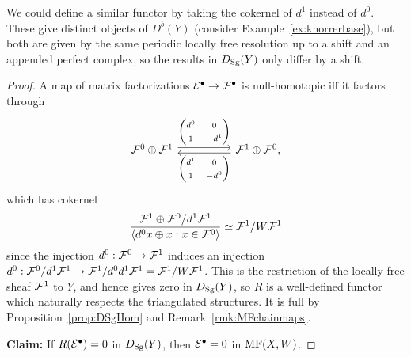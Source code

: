 \begin{remark}{}{}
    We could define a similar functor by taking the cokernel of $d^1$ instead of
    $d^0$. These give distinct objects of $D^b(Y)$ (consider
    Example~\ref{ex:knorrerbase}), but both are given by the same periodic
    locally free resolution up to a shift and an appended perfect complex, so
    the results in $D_{\mathrm{Sg}}(Y)$ only differ by a shift.
\end{remark}

\begin{proof}
    A map of matrix factorizations $\mathcal{E}^\bullet\to\mathcal{F}^\bullet$ is
    null-homotopic iff it factors through
    \begin{equation*}
        \begin{tikzcd}[ampersand replacement=\&,column sep=huge]
            \calF^0\oplus\calF^1 \ar[shift left]{r}{\begin{pmatrix}
                    d^0 & 0 \\ 1 & -d^1
            \end{pmatrix}} \&
            \calF^1\oplus\calF^0, \ar[shift left]{l}{\begin{pmatrix}
                    d^1 & 0 \\ 1 & -d^0
            \end{pmatrix}}
        \end{tikzcd}
    \end{equation*}
    which has cokernel
    \begin{equation*}
        \frac{\mathcal{F}^1\oplus\mathcal{F}^0/d^1\mathcal{F}^1}
            {\langle d^0x\oplus x : x\in\mathcal{F}^0\rangle}
            \simeq \mathcal{F}^1/W\mathcal{F}^1
    \end{equation*}
    since the injection $d^0:\mathcal{F}^0\to\mathcal{F}^1$ induces an injection
    $d^0:\mathcal{F}^0/d^1\mathcal{F}^1\to\mathcal{F}^1/d^0d^1\mathcal{F}^1=\mathcal{F}^1/W\mathcal{F}^1$. This is
    the restriction of the locally free sheaf $\mathcal{F}^1$ to $Y$, and hence gives
    zero in $D_{\mathrm{Sg}}(Y)$, so $R$ is a well-defined functor which naturally
    respects the triangulated structures. It is full by
    Proposition~\ref{prop:DSgHom} and Remark~\ref{rmk:MFchainmaps}.

    \textbf{Claim:} If $R(\mathcal{E}^\bullet)=0$ in $D_{\mathrm{Sg}}(Y)$, then
    $\mathcal{E}^\bullet=0$ in $\mathrm{MF}(X,W)$.


\end{proof}
